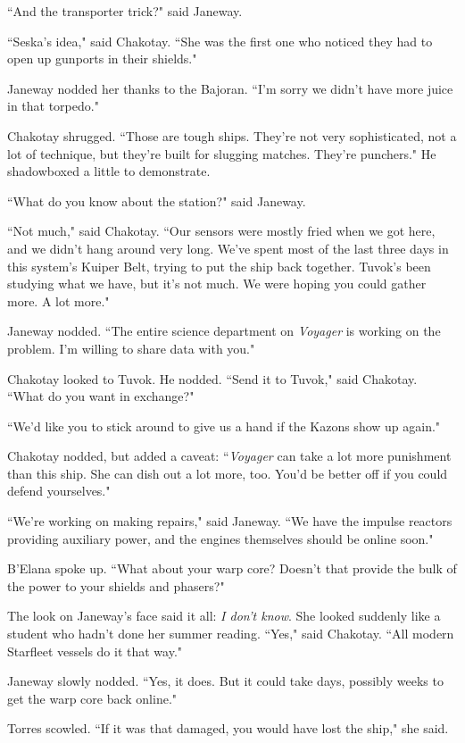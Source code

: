 \documentclass[twoside,letterpaper,12pt]{memoir}
\begin{document}
``And the transporter trick?" said Janeway.

``Seska's idea," said Chakotay. ``She was the first one who noticed they had to open up gunports in their shields."

Janeway nodded her thanks to the Bajoran. ``I'm sorry we didn't have more juice in that torpedo."

Chakotay shrugged. ``Those are tough ships. They're not very sophisticated, not a lot of technique, but they're built for slugging matches. They're punchers." He shadowboxed a little to demonstrate.

``What do you know about the station?" said Janeway.

``Not much," said Chakotay. ``Our sensors were mostly fried when we got here, and we didn't hang around very long. We've spent most of the last three days in this system's Kuiper Belt, trying to put the ship back together. Tuvok's been studying what we have, but it's not much. We were hoping you could gather more. A lot more."

Janeway nodded. ``The entire science department on \textit{Voyager} is working on the problem. I'm willing to share data with you."

Chakotay looked to Tuvok. He nodded. ``Send it to Tuvok," said Chakotay. ``What do you want in exchange?"

``We'd like you to stick around to give us a hand if the Kazons show up again."

Chakotay nodded, but added a caveat: ``\textit{Voyager} can take a lot more punishment than this ship. She can dish out a lot more, too. You'd be better off if you could defend yourselves."

``We're working on making repairs," said Janeway. ``We have the impulse reactors providing auxiliary power, and the engines themselves should be online soon."

B'Elana spoke up. ``What about your warp core? Doesn't that provide the bulk of the power to your shields and phasers?"

The look on Janeway's face said it all: \textit{I don't know}. She looked suddenly like a student who hadn't done her summer reading. ``Yes," said Chakotay. ``All modern Starfleet vessels do it that way."

Janeway slowly nodded. ``Yes, it does. But it could take days, possibly weeks to get the warp core back online."

Torres scowled. ``If it was that damaged, you would have lost the ship," she said.
\end{document}
